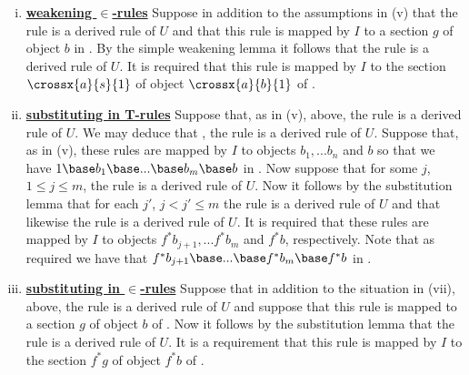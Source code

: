 \begin{definition}
\begin{enumerate}[(i)]
\item \underline{\textbf{weakening $\boldsymbol {\in}$-rules}} 
Suppose in addition to the assumptions in (v) that the rule  is a derived rule of $U$ 
and that this rule is mapped by $I$ to a section $g$ of object $b$ in \catc.
By the simple weakening lemma it follows that the rule 
is a derived rule of $U$. It is required that this rule is mapped by $I$ to the section $\crossx{a}{s}{1}$
of object $\crossx{a}{b}{1}$ of \catc.

\item \underline{\textbf{substituting in T-rules}} 
Suppose that, as in (v), above, the rule 
 is a derived rule of $U$.
We may deduce that \foreachj, the rule    is a derived rule of $U$. 
Suppose that, as in (v), these rules are mapped by $I$ to objects $b_1,...b_n$ and $b$ so that
we have  $1 \base b_1 \base ... \base b_m \base b$ in \catc. Now suppose that for some $j$, $1 \leq j \leq m$, the rule
 is a derived rule of $U$. 
Now it follows by the substitution lemma that for each $j'$, $j < j' \leq m$ the rule
 is a derived rule of $U$ and that likewise the rule
 is a derived rule of $U$.
It is required that these rules are mapped by $I$ to objects $f^*b_{j+1},...f^*b_m$ and $f^*b$, respectively.
Note that as required we have that $f^*b_{j+1}\base ... \base f^*b_m \base f^*b$ in \catc.

\item \underline{\textbf{substituting in $\boldsymbol {\in}$-rules}} 
Suppose that in addition to the situation in (vii), above, the rule
is a derived rule of $U$ and suppose that this rule is mapped to a section $g$ of object $b$ of \catc.
Now it follows by the substitution lemma that the rule
is a derived rule of $U$.
It is a requirement that this rule is mapped by $I$ to the section $f^*g$ of object $f^*b$ of \catc.
\end{enumerate}
\end{definition}



